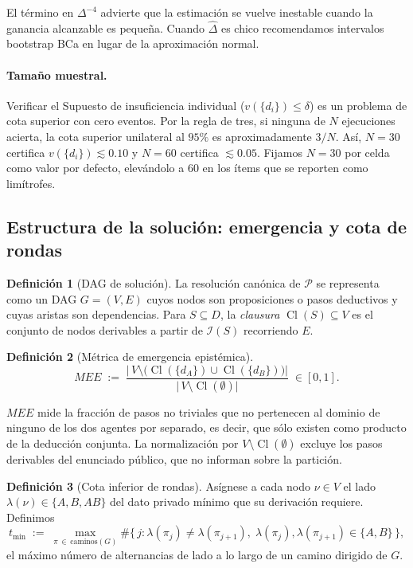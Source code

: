 \documentclass[11pt,a4paper]{article}
\theoremstyle{definition}
\newtheorem{definicion}{Definición}[section]
\theoremstyle{plain}
\theoremstyle{remark}
\newcommand{\Info}{\mathcal{I}}
\newcommand{\Cl}{\operatorname{Cl}}
\begin{document}
El término en $\Delta^{-4}$ advierte que la estimación se vuelve inestable cuando
la ganancia alcanzable es pequeña. Cuando $\hat\Delta$ es chico recomendamos
intervalos bootstrap BCa en lugar de la aproximación normal.

\paragraph{Tamaño muestral.} Verificar el Supuesto de insuficiencia individual
($v(\{d_i\})\le\delta$) es un problema de cota superior con cero eventos. Por la
regla de tres, si ninguna de $N$ ejecuciones acierta, la cota superior unilateral
al $95\%$ es aproximadamente $3/N$. Así, $N=30$ certifica $v(\{d_i\})\lesssim0.10$
y $N=60$ certifica $\lesssim 0.05$. Fijamos $N=30$ por celda como valor por
defecto, elevándolo a $60$ en los ítems que se reporten como limítrofes.

\subsection{Estructura de la solución: emergencia y cota de rondas}

\begin{definicion}[DAG de solución]
La resolución canónica de $\mathcal{P}$ se representa como un DAG $G=(V,E)$ cuyos
nodos son proposiciones o pasos deductivos y cuyas aristas son dependencias.
Para $S\subseteq D$, la \emph{clausura} $\Cl(S)\subseteq V$ es el conjunto de
nodos derivables a partir de $\Info(S)$ recorriendo $E$.
\end{definicion}

\begin{definicion}[Métrica de emergencia epistémica]
\[
  MEE \;:=\; \frac{\big|\,V\setminus\big(\Cl(\{d_A\})\cup \Cl(\{d_B\})\big)\big|}
                  {\big|\,V\setminus \Cl(\emptyset)\big|}\;\in[0,1].
\]
\end{definicion}

$MEE$ mide la fracción de pasos no triviales que no pertenecen al dominio de
ninguno de los dos agentes por separado, es decir, que sólo existen como producto
de la deducción conjunta. La normalización por $V\setminus\Cl(\emptyset)$ excluye
los pasos derivables del enunciado público, que no informan sobre la partición.

\begin{definicion}[Cota inferior de rondas]\label{def:tmin}
Asígnese a cada nodo $\nu\in V$ el lado $\lambda(\nu)\in\{A,B,AB\}$ del dato
privado mínimo que su derivación requiere. Definimos
\[
  t_{\min} \;:=\; \max_{\pi\,\in\,\mathrm{caminos}(G)}
  \#\big\{\, j : \lambda(\pi_j)\neq\lambda(\pi_{j+1}),\;
  \lambda(\pi_j),\lambda(\pi_{j+1})\in\{A,B\} \,\big\},
\]
el máximo número de alternancias de lado a lo largo de un camino dirigido de $G$.
\end{definicion}
\end{document}

